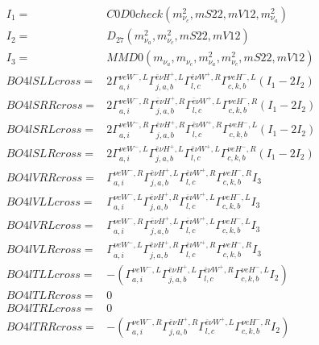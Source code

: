 \documentclass[A4,landscape]{article}
\begin{document}
\begin{align} 
I_1 = & C0D0check(m^2_{\nu_{{c}}}, mS22, mV12, m^2_{\nu_{{a}}}) \\ 
I_2 = & D_{27}(m^2_{\nu_{{a}}}, m^2_{\nu_{{c}}}, mS22, mV12) \\ 
I_3 = & MMD0(m_{\nu_{{a}}}, m_{\nu_{{c}}}, m^2_{\nu_{{a}}}, m^2_{\nu_{{c}}}, mS22, mV12) \\ 
  BO4lSLLcross= & 2  \Gamma^{\nu e W^-,L}_{a, i} \Gamma^{\bar{e}\nu H^+,L}_{j, a, b} \Gamma^{\bar{e}\nu W^+ ,R}_{l, c} \Gamma^{\nu e H^- ,L}_{c, k, b} (I_1 - 2 I_2) \\ 
  BO4lSRRcross= & 2  \Gamma^{\nu e W^-,R}_{a, i} \Gamma^{\bar{e}\nu H^+,R}_{j, a, b} \Gamma^{\bar{e}\nu W^+ ,L}_{l, c} \Gamma^{\nu e H^- ,R}_{c, k, b} (I_1 - 2 I_2) \\ 
  BO4lSRLcross= & 2  \Gamma^{\nu e W^-,R}_{a, i} \Gamma^{\bar{e}\nu H^+,R}_{j, a, b} \Gamma^{\bar{e}\nu W^+ ,R}_{l, c} \Gamma^{\nu e H^- ,L}_{c, k, b} (I_1 - 2 I_2) \\ 
  BO4lSLRcross= & 2  \Gamma^{\nu e W^-,L}_{a, i} \Gamma^{\bar{e}\nu H^+,L}_{j, a, b} \Gamma^{\bar{e}\nu W^+ ,L}_{l, c} \Gamma^{\nu e H^- ,R}_{c, k, b} (I_1 - 2 I_2) \\ 
  BO4lVRRcross= &  \Gamma^{\nu e W^-,R}_{a, i} \Gamma^{\bar{e}\nu H^+,L}_{j, a, b} \Gamma^{\bar{e}\nu W^+ ,R}_{l, c} \Gamma^{\nu e H^- ,R}_{c, k, b} I_3 \\ 
  BO4lVLLcross= &  \Gamma^{\nu e W^-,L}_{a, i} \Gamma^{\bar{e}\nu H^+,R}_{j, a, b} \Gamma^{\bar{e}\nu W^+ ,L}_{l, c} \Gamma^{\nu e H^- ,L}_{c, k, b} I_3 \\ 
  BO4lVRLcross= &  \Gamma^{\nu e W^-,R}_{a, i} \Gamma^{\bar{e}\nu H^+,L}_{j, a, b} \Gamma^{\bar{e}\nu W^+ ,L}_{l, c} \Gamma^{\nu e H^- ,L}_{c, k, b} I_3 \\ 
  BO4lVLRcross= &  \Gamma^{\nu e W^-,L}_{a, i} \Gamma^{\bar{e}\nu H^+,R}_{j, a, b} \Gamma^{\bar{e}\nu W^+ ,R}_{l, c} \Gamma^{\nu e H^- ,R}_{c, k, b} I_3 \\ 
  BO4lTLLcross= & -( \Gamma^{\nu e W^-,L}_{a, i} \Gamma^{\bar{e}\nu H^+,L}_{j, a, b} \Gamma^{\bar{e}\nu W^+ ,R}_{l, c} \Gamma^{\nu e H^- ,L}_{c, k, b} I_2) \\ 
  BO4lTLRcross= & 0 \\ 
  BO4lTRLcross= & 0 \\ 
  BO4lTRRcross= & -( \Gamma^{\nu e W^-,R}_{a, i} \Gamma^{\bar{e}\nu H^+,R}_{j, a, b} \Gamma^{\bar{e}\nu W^+ ,L}_{l, c} \Gamma^{\nu e H^- ,R}_{c, k, b} I_2) \\ 
\end{align} 
\end{document}
